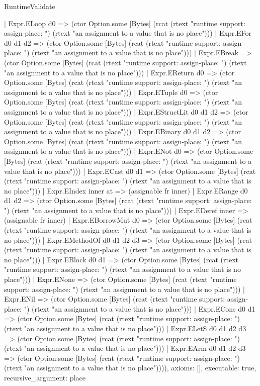 \begin{lexlean}{RuntimeValidate}
\begin{semanticmodule}
{    | Expr.ELoop d0 => (ctor Option.some [Bytes] (rcat (rtext "runtime support: assign-place: ") (rtext "an assignment to a value that is no place")))
    | Expr.EFor d0 d1 d2 => (ctor Option.some [Bytes] (rcat (rtext "runtime support: assign-place: ") (rtext "an assignment to a value that is no place")))
    | Expr.EBreak => (ctor Option.some [Bytes] (rcat (rtext "runtime support: assign-place: ") (rtext "an assignment to a value that is no place")))
    | Expr.EReturn d0 => (ctor Option.some [Bytes] (rcat (rtext "runtime support: assign-place: ") (rtext "an assignment to a value that is no place")))
    | Expr.ETuple d0 => (ctor Option.some [Bytes] (rcat (rtext "runtime support: assign-place: ") (rtext "an assignment to a value that is no place")))
    | Expr.EStructLit d0 d1 d2 => (ctor Option.some [Bytes] (rcat (rtext "runtime support: assign-place: ") (rtext "an assignment to a value that is no place")))
    | Expr.EBinary d0 d1 d2 => (ctor Option.some [Bytes] (rcat (rtext "runtime support: assign-place: ") (rtext "an assignment to a value that is no place")))
    | Expr.ENot d0 => (ctor Option.some [Bytes] (rcat (rtext "runtime support: assign-place: ") (rtext "an assignment to a value that is no place")))
    | Expr.ECast d0 d1 => (ctor Option.some [Bytes] (rcat (rtext "runtime support: assign-place: ") (rtext "an assignment to a value that is no place")))
    | Expr.EIndex inner at => (assignable fr inner)
    | Expr.ERange d0 d1 d2 => (ctor Option.some [Bytes] (rcat (rtext "runtime support: assign-place: ") (rtext "an assignment to a value that is no place")))
    | Expr.EDeref inner => (assignable fr inner)
    | Expr.EBorrowMut d0 => (ctor Option.some [Bytes] (rcat (rtext "runtime support: assign-place: ") (rtext "an assignment to a value that is no place")))
    | Expr.EMethodOf d0 d1 d2 d3 => (ctor Option.some [Bytes] (rcat (rtext "runtime support: assign-place: ") (rtext "an assignment to a value that is no place")))
    | Expr.EBlock d0 d1 => (ctor Option.some [Bytes] (rcat (rtext "runtime support: assign-place: ") (rtext "an assignment to a value that is no place")))
    | Expr.ENone => (ctor Option.some [Bytes] (rcat (rtext "runtime support: assign-place: ") (rtext "an assignment to a value that is no place")))
    | Expr.ENil => (ctor Option.some [Bytes] (rcat (rtext "runtime support: assign-place: ") (rtext "an assignment to a value that is no place")))
    | Expr.ECons d0 d1 => (ctor Option.some [Bytes] (rcat (rtext "runtime support: assign-place: ") (rtext "an assignment to a value that is no place")))
    | Expr.ELetS d0 d1 d2 d3 => (ctor Option.some [Bytes] (rcat (rtext "runtime support: assign-place: ") (rtext "an assignment to a value that is no place")))
    | Expr.EArm d0 d1 d2 d3 => (ctor Option.some [Bytes] (rcat (rtext "runtime support: assign-place: ") (rtext "an assignment to a value that is no place")))),
  axioms: [],
  executable: true,
  recursive_argument: place
}


\end{semanticmodule}
\end{lexlean}
